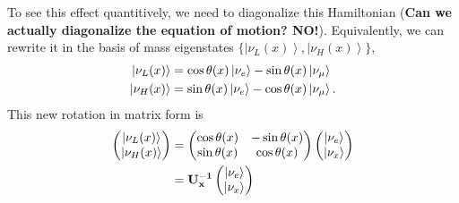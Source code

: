 \documentclass[letterpaper,12pt,english]{sphinxmanual}
\newcommand{\ket}[1]{\left| #1\right\rangle}
\begin{document}
To see this effect quantitively, we need to diagonalize this Hamiltonian (\textbf{Can we actually diagonalize the equation of motion? NO!}). Equivalently, we can rewrite it in the basis of mass eigenstates \(\{\ket{\nu_L(x)}, \ket{\nu_H(x)}\}\),
\begin{gather}
\begin{split}\ket{\nu_L(x)} &= \cos\theta(x) \ket{\nu_e} - \sin\theta(x) \ket{\nu_\mu} \\
\ket{\nu_H(x)} & =  \sin\theta(x) \ket{\nu_e} - \cos\theta(x) \ket{\nu_\mu}.\end{split}\notag
\end{gather}
This new rotation in matrix form is
\begin{gather}
\begin{split}\begin{pmatrix} \ket{\nu_L(x)} \\ \ket{\nu_H(x)} \end{pmatrix} &= \begin{pmatrix} \cos \theta(x) & -\sin\theta(x) \\ \sin\theta(x) & \cos\theta(x) \end{pmatrix} \begin{pmatrix}\ket{\nu_e} \\ \ket{\nu_x} \end{pmatrix} \\
& = \mathbf{U^{-1}_x } \begin{pmatrix}\ket{\nu_e} \\ \ket{\nu_x} \end{pmatrix}\end{split}\notag
\end{gather}
\end{document}
